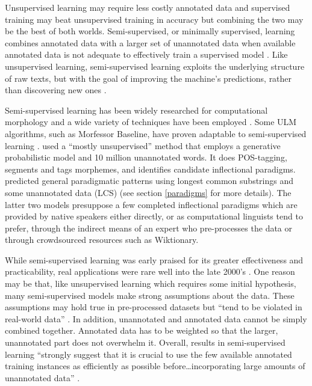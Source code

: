 \documentclass[12pt]{article}
\begin{document}
Unsupervised learning may require less costly annotated data and supervised training may beat unsupervised training in accuracy but combining the two may be the best of both worlds. Semi-supervised, or minimally supervised, learning combines annotated data with a larger set of unannotated data when available annotated data is not adequate to effectively train a supervised model \cite{kohonen_semi-supervised_2010,poon_unsupervised_2009}. Like unsupervised learning, semi-supervised learning exploits the underlying structure of raw texts, but with the goal of improving the machine’s predictions, rather than discovering new ones \cite{settles_active_2010}. 

Semi-supervised learning has been widely researched for computational morphology and a wide variety of techniques have been employed \cite{ruokolainen_comparative_2016}. Some ULM algorithms, such as Morfessor Baseline, have proven adaptable to semi-supervised learning \cite{kohonen_semi-supervised_2010}.  used a ``mostly unsupervised'' method that employs a generative probabilistic model and 10 million unannotated words. It does POS-tagging, segments and tags morphemes, and identifies candidate inflectional paradigms.  predicted general paradigmatic patterns using longest common substrings and some unannotated data (LCS) (see section \ref{paradigms} for more details). The latter two models presuppose a few completed inflectional paradigms which are provided by native speakers either directly, or as computational linguists tend to prefer, through the indirect means of an expert who pre-processes the data or through crowdsourced resources such as Wiktionary.

While semi-supervised learning was early praised for its greater effectiveness and practicability, real applications were rare well into the late 2000’s \cite{druck_reducing_2007}. One reason may be that, like unsupervised learning which requires some initial hypothesis, many semi-supervised models make strong assumptions about the data. These assumptions may hold true in pre-processed datasets but ``tend to be violated in real-world data'' \cite[page 1]{druck_reducing_2007}. In addition, unannotated and annotated data cannot be simply combined together. Annotated data has to be weighted so that the larger, unannotated part does not overwhelm it. Overall, results in semi-supervised learning ``strongly suggest that it is crucial to use the few available annotated training instances as efficiently as possible before…incorporating large amounts of unannotated data'' \cite[page 35]{ruokolainen_supervised_2013}. 
\end{document}
